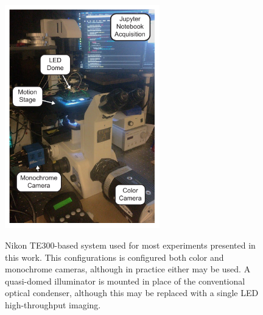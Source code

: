 \begin{figure}
    \centering
    \includegraphics[width=0.6\textwidth]{figures/fig_intro_dome_system.pdf}
    \label{fig:intro_system_dome}
    \caption{Nikon TE300-based system used for most experiments presented in this work. This configurations is configured both color and monochrome cameras, although in practice either may be used. A quasi-domed illuminator is mounted in place of the conventional optical condenser, although this may be replaced with a single LED high-throughput imaging.}
\end{figure}